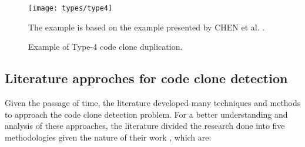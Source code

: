 \begin{figure}
\texttt{[image: types/type4]}
\caption{Example of Type-4 code clone duplication.}
The example is based on the example presented by CHEN et al. \citep{litreview}. 
\label{fig:type4}
\end{figure}

\subsection{Literature approches for code clone detection}

Given the passage of time, the literature developed many techniques and methods to approach the code clone 
detection problem. For a better understanding and analysis of these approaches, the literature divided the 
research done into five methodologies given the nature of their work  \citep{litreview}, which are:

